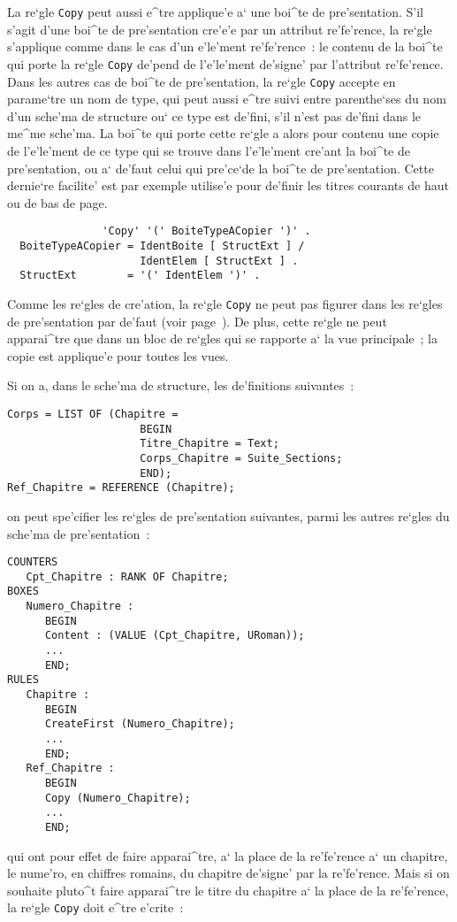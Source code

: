 {La re`gle {\tt Copy} peut aussi e^tre applique'e a` une boi^te de
pre'sentation. S'il s'agit d'une boi^te de pre'sentation cre'e'e par un
attribut re'fe'rence, la re`gle s'applique comme dans le cas d'un e'le'ment
re'fe'rence~: le contenu de la boi^te qui porte la re`gle {\tt Copy} de'pend
de l'e'le'ment de'signe' par l'attribut re'fe'rence.
Dans les autres cas de boi^te de pre'sentation, la re`gle {\tt Copy} accepte
en parame`tre un nom de type, qui peut aussi e^tre suivi entre parenthe`ses
du nom d'un sche'ma de structure ou` ce type est de'fini, s'il n'est pas
de'fini dans le me^me sche'ma.
La boi^te qui porte cette re`gle a alors pour contenu une copie de
l'e'le'ment de ce type qui se trouve dans l'e'le'ment cre'ant la boi^te
de pre'sentation, ou a` de'faut celui qui pre'ce`de la boi^te de pre'sentation.
Cette dernie`re facilite' est par exemple utilise'e pour de'finir les titres
courants de haut ou de bas de page.

\begin{verbatim}
               'Copy' '(' BoiteTypeACopier ')' .
  BoiteTypeACopier = IdentBoite [ StructExt ] /
                     IdentElem [ StructExt ] .
  StructExt        = '(' IdentElem ')' .
\end{verbatim}

Comme les re`gles de cre'ation, la re`gle {\tt Copy} ne peut pas figurer dans
les re`gles de pre'sentation par de'faut (voir page~\pageref{reglesdefaut}).
De plus, cette re`gle ne peut apparai^tre que dans un bloc de re`gles qui
se rapporte a` la vue principale~; la copie est applique'e  pour toutes les
vues.

\begin{example}
Si on a, dans le sche'ma de structure, les de'finitions suivantes~:

\begin{verbatim}
Corps = LIST OF (Chapitre =
                     BEGIN
                     Titre_Chapitre = Text;
                     Corps_Chapitre = Suite_Sections;
                     END);
Ref_Chapitre = REFERENCE (Chapitre);
\end{verbatim}
on peut spe'cifier les re`gles de pre'sentation suivantes, parmi les autres
re`gles du sche'ma de pre'sentation~:

\begin{verbatim}
COUNTERS
   Cpt_Chapitre : RANK OF Chapitre;
BOXES
   Numero_Chapitre :
      BEGIN
      Content : (VALUE (Cpt_Chapitre, URoman));
      ...
      END;
RULES
   Chapitre :
      BEGIN
      CreateFirst (Numero_Chapitre);
      ...
      END;
   Ref_Chapitre :
      BEGIN
      Copy (Numero_Chapitre);
      ...
      END;
\end{verbatim}
qui ont pour effet de faire apparai^tre, a` la place de la re'fe'rence a` un
chapitre, le nume'ro, en chiffres romains, du chapitre de'signe' par la
re'fe'rence. Mais si on souhaite pluto^t faire apparai^tre le titre du chapitre
a` la place de la re'fe'rence, la re`gle {\tt Copy} doit e^tre e'crite~:


\end{example}}
